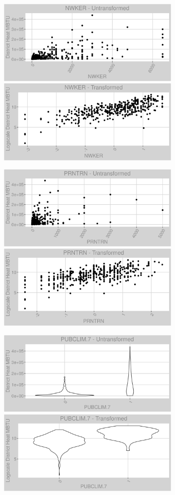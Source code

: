 \begin{figure}
\centering
\begin{subfigure}{1\textwidth}
\centering
\includegraphics[width=.49\textwidth, height=0.3\textheight]{Images/district_heat_var_original_0.png}
\includegraphics[width=.49\textwidth, height=0.3\textheight]{Images/district_heat_var_transformed_0.png}
\centering
\end{subfigure}
\begin{subfigure}{1\textwidth}
\centering
\includegraphics[width=.49\textwidth, height=0.3\textheight]{Images/district_heat_var_original_1.png}
\includegraphics[width=.49\textwidth, height=0.3\textheight]{Images/district_heat_var_transformed_1.png}
\end{subfigure}
\begin{subfigure}{1\textwidth}
\centering
\includegraphics[width=.49\textwidth, height=0.3\textheight]{Images/district_heat_var_original_2.png}
\includegraphics[width=.49\textwidth, height=0.3\textheight]{Images/district_heat_var_transformed_2.png}
\end{subfigure}
\end{figure}
